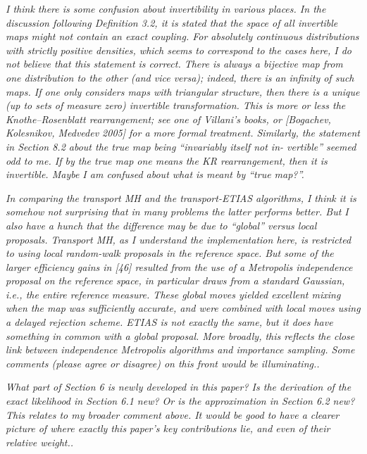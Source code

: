 \documentclass{article}
\newcommand{\comment}[2]{\vspace{0.6cm}{\bf Comment:} {\it #1.}

\vspace{0.3cm}{\bf Answer:} #2}
\begin{document}
\comment{I think there is some confusion about invertibility in various places.
In the discussion following Definition 3.2, it is stated that the space of all invertible maps might not contain an exact coupling. For absolutely continuous distributions with strictly positive densities, which seems to correspond to the cases here, I do not believe that this statement is correct. There is always a bijective map from one distribution to the other (and vice versa); indeed, there is an infinity of such maps. If one only considers maps with triangular structure, then there is a unique (up to sets of measure zero) invertible transformation. This is more or less the Knothe–Rosenblatt rearrangement; see one of Villani’s books, or [Bogachev, Kolesnikov, Medvedev 2005] for a more formal treatment.
Similarly, the statement in Section 8.2 about the true map being “invariably itself not in- vertible” seemed odd to me. If by the true map one means the KR rearrangement, then it is invertible. Maybe I am confused about what is meant by “true map?”}{}

\comment{ In comparing the transport MH and the transport-ETIAS algorithms, I think it is somehow not surprising that in many problems the latter performs better. But I also have a hunch that the difference may be due to “global” versus local proposals. Transport MH, as I understand the implementation here, is restricted to using local random-walk proposals in the reference space. But some of the larger efficiency gains in [46] resulted from the use of a Metropolis independence proposal on the reference space, in particular draws from a standard Gaussian, i.e., the entire reference measure. These global moves yielded excellent mixing when the map was sufficiently accurate, and were combined with local moves using a delayed rejection scheme. ETIAS is not exactly the same, but it does have something in common with a global proposal. More broadly, this reflects the close link between independence Metropolis algorithms and importance sampling. Some comments (please agree or disagree) on this front would be illuminating.}{}

\comment{What part of Section 6 is newly developed in this paper? Is the derivation of the exact likelihood in Section 6.1 new? Or is the approximation in Section 6.2 new? This relates to my broader comment above. It would be good to have a clearer picture of where exactly this paper’s key contributions lie, and even of their relative weight.}{}
\end{document}
